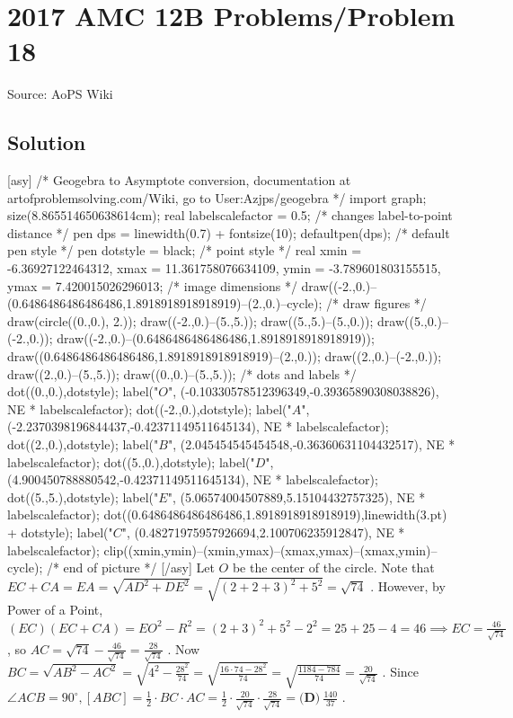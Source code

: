 \documentclass[12pt]{article}
\begin{document}
\section*{{2017 AMC 12B Problems/Problem 18}}
Source: AoPS Wiki

\subsection*{Solution}
[asy] /* Geogebra to Asymptote conversion, documentation at artofproblemsolving.com/Wiki, go to User:Azjps/geogebra */ import graph; size(8.865514650638614cm); real labelscalefactor = 0.5; /* changes label-to-point distance */ pen dps = linewidth(0.7) + fontsize(10); defaultpen(dps); /* default pen style */ pen dotstyle = black; /* point style */ real xmin = -6.36927122464312, xmax = 11.361758076634109, ymin = -3.789601803155515, ymax = 7.420015026296013; /* image dimensions */ draw((-2.,0.)--(0.6486486486486486,1.8918918918918919)--(2.,0.)--cycle); /* draw figures */ draw(circle((0.,0.), 2.)); draw((-2.,0.)--(5.,5.)); draw((5.,5.)--(5.,0.)); draw((5.,0.)--(-2.,0.)); draw((-2.,0.)--(0.6486486486486486,1.8918918918918919)); draw((0.6486486486486486,1.8918918918918919)--(2.,0.)); draw((2.,0.)--(-2.,0.)); draw((2.,0.)--(5.,5.)); draw((0.,0.)--(5.,5.)); /* dots and labels */ dot((0.,0.),dotstyle); label("$O$", (-0.10330578512396349,-0.39365890308038826), NE * labelscalefactor); dot((-2.,0.),dotstyle); label("$A$", (-2.2370398196844437,-0.42371149511645134), NE * labelscalefactor); dot((2.,0.),dotstyle); label("$B$", (2.045454545454548,-0.36360631104432517), NE * labelscalefactor); dot((5.,0.),dotstyle); label("$D$", (4.900450788880542,-0.42371149511645134), NE * labelscalefactor); dot((5.,5.),dotstyle); label("$E$", (5.06574004507889,5.15104432757325), NE * labelscalefactor); dot((0.6486486486486486,1.8918918918918919),linewidth(3.pt) + dotstyle); label("$C$", (0.48271975957926694,2.100706235912847), NE * labelscalefactor); clip((xmin,ymin)--(xmin,ymax)--(xmax,ymax)--(xmax,ymin)--cycle); /* end of picture */ [/asy] Let $O$ be the center of the circle. Note that $EC + CA = EA = \sqrt{AD^2 + DE^2} = \sqrt{(2+2+3)^2 + 5^2} = \sqrt{74}$ . However, by Power of a Point, $(EC)(EC + CA) = EO^2 - R^2 = (2+3)^2 + 5^2 - 2^2 = 25 + 25 - 4 = 46 \implies EC = \frac{46}{\sqrt{74}}$ , so $AC = \sqrt{74} - \frac{46}{\sqrt{74}} = \frac{28}{\sqrt{74}}$ . Now $BC = \sqrt{AB^2 - AC^2} = \sqrt{4^2 - \frac{28^2}{74}} = \sqrt{\frac{16 \cdot 74 - 28^2}{74}} = \sqrt{\frac{1184 - 784}{74}} = \frac{20}{\sqrt{74}}$ . Since $\angle ACB = 90^{\circ}, [ABC] = \frac{1}{2} \cdot BC \cdot AC = \frac{1}{2} \cdot \frac{20}{\sqrt{74}} \cdot \frac{28}{\sqrt{74}} = \boxed{\textbf{(D)}\ \frac{140}{37}}$ .
\end{document}

